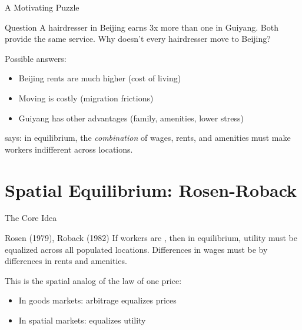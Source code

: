 \documentclass{beamer}
\begin{document}
\begin{frame}{A Motivating Puzzle}

    \begin{block}{Question}
        A hairdresser in Beijing earns 3x more than one in Guiyang. Both provide the same service. Why doesn't every hairdresser move to Beijing?
    \end{block}

    \vspace{1em}
    Possible answers:
    \begin{itemize}
        \item Beijing rents are much higher (cost of living)
        \item Moving is costly (migration frictions)
        \item Guiyang has other advantages (family, amenities, lower stress)
    \end{itemize}

    \vspace{0.5em}
     says: in equilibrium, the \emph{combination} of wages, rents, and amenities must make workers indifferent across locations.

\end{frame}


\section{Spatial Equilibrium: Rosen-Roback}

\begin{frame}{The Core Idea}

    \begin{exampleblock}{Rosen (1979), Roback (1982)}
        If workers are , then in equilibrium, utility must be equalized across all populated locations. Differences in wages must be  by differences in rents and amenities.
    \end{exampleblock}

    \vspace{0.5em}
    This is the spatial analog of the law of one price:
    \begin{itemize}
        \item In goods markets: arbitrage equalizes prices
        \item In spatial markets:  equalizes utility
    \end{itemize}

    \vspace{0.5em}

\end{frame}
\end{document}
